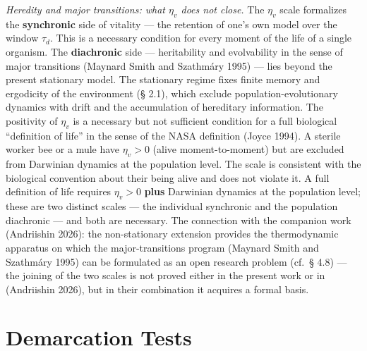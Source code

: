 \documentclass[pdflatex,sn-mathphys-ay]{sn-jnl}
\begin{document}
\emph{Heredity and major transitions: what \(\eta_v\) does not close.} The \(\eta_v\) scale formalizes the \textbf{synchronic} side of vitality --- the retention of one's own model over the window \(\tau_d\). This is a necessary condition for every moment of the life of a single organism. The \textbf{diachronic} side --- heritability and evolvability in the sense of major transitions (Maynard Smith and Szathmáry 1995) --- lies beyond the present stationary model. The stationary regime fixes finite memory and ergodicity of the environment (§ 2.1), which exclude population-evolutionary dynamics with drift and the accumulation of hereditary information. The positivity of \(\eta_v\) is a necessary but not sufficient condition for a full biological ``definition of life'' in the sense of the NASA definition (Joyce 1994). A sterile worker bee or a mule have \(\eta_v > 0\) (alive moment-to-moment) but are excluded from Darwinian dynamics at the population level. The scale is consistent with the biological convention about their being alive and does not violate it. A full definition of life requires \(\eta_v > 0\) \textbf{plus} Darwinian dynamics at the population level; these are two distinct scales --- the individual synchronic and the population diachronic --- and both are necessary. The connection with the companion work (Andriishin 2026): the non-stationary extension provides the thermodynamic apparatus on which the major-transitions program (Maynard Smith and Szathmáry 1995) can be formulated as an open research problem (cf.~§ 4.8) --- the joining of the two scales is not proved either in the present work or in (Andriishin 2026), but in their combination it acquires a formal basis.

\section{Demarcation Tests}\label{demarcation-tests}
\end{document}

